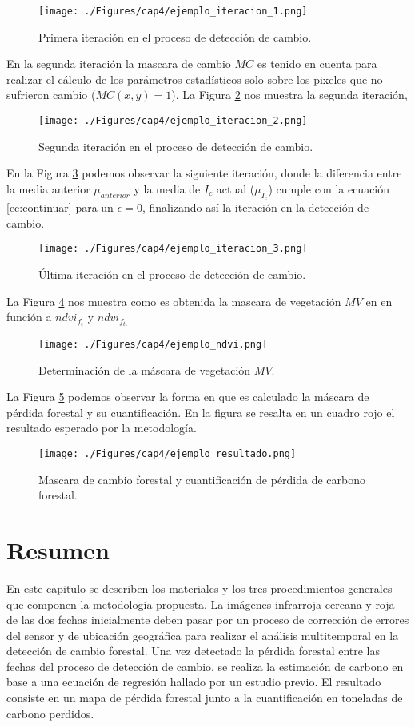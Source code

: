 \begin{figure}[H]
	\centering
	\texttt{[image: ./Figures/cap4/ejemplo\_iteracion\_1.png]}
	\caption{Primera iteraci\'on en el proceso de detecci\'on de cambio.}
	\label{fig:ejemplo_2}
\end{figure}
En la segunda iteraci\'on la mascara de cambio $ MC $ es tenido en cuenta para realizar el c\'alculo de los par\'ametros estad\'isticos solo sobre los pixeles que no sufrieron cambio ($ MC(x,y)=1 $). La Figura \ref{fig:ejemplo_3} nos muestra la segunda iteraci\'on, 
\begin{figure}[H]
	\centering
	\texttt{[image: ./Figures/cap4/ejemplo\_iteracion\_2.png]}
	\caption{Segunda iteraci\'on en el proceso de detecci\'on de cambio.}
	\label{fig:ejemplo_3}
\end{figure}
En la Figura \ref{fig:ejemplo_4} podemos observar la siguiente iteraci\'on, donde la diferencia entre la media anterior $ \mu_{anterior} $ y la media de $ I_{c} $ actual ($ \mu_{I_{c}} $) cumple con la ecuaci\'on \ref{ec:continuar} para un $\epsilon=0 $, finalizando as\'i la iteraci\'on en la detecci\'on de cambio.
\begin{figure}[H]
	\centering
	\texttt{[image: ./Figures/cap4/ejemplo\_iteracion\_3.png]}
	\caption{\'Ultima iteraci\'on en el proceso de detecci\'on de cambio.}
	\label{fig:ejemplo_4}
\end{figure}
La Figura \ref{fig:ejemplo_5} nos muestra como es obtenida la mascara de vegetaci\'on $ MV $ en en funci\'on a $ ndvi_{f_{t}} $ y $ ndvi_{f_{t_{*}}} $
\begin{figure}[H]
	\centering
	\texttt{[image: ./Figures/cap4/ejemplo\_ndvi.png]}
	\caption{Determinaci\'on de la m\'ascara de vegetaci\'on $ MV $.}
	\label{fig:ejemplo_5}
\end{figure}
La Figura \ref{fig:ejemplo_6} podemos observar la forma en que es calculado la m\'ascara de p\'erdida forestal y su cuantificaci\'on. En la figura se resalta en un cuadro rojo el resultado esperado por la metodolog\'ia. 
\begin{figure}[H]
	\centering
	\texttt{[image: ./Figures/cap4/ejemplo\_resultado.png]}
	\caption{Mascara de cambio forestal y cuantificaci\'on de p\'erdida de carbono forestal.}
	\label{fig:ejemplo_6}
\end{figure}
\section{Resumen}
En este capitulo se describen los materiales y los tres procedimientos generales que componen la metodolog\'ia propuesta. La im\'agenes infrarroja cercana y roja de las dos fechas inicialmente deben pasar por un proceso de correcci\'on de errores del sensor y de ubicaci\'on geogr\'afica para realizar el an\'alisis multitemporal en la detecci\'on de cambio forestal. Una vez detectado la p\'erdida forestal entre las fechas del proceso de detecci\'on de cambio, se realiza la estimaci\'on de carbono en base a una ecuaci\'on de regresi\'on hallado por un estudio previo. El resultado consiste en un mapa de p\'erdida forestal junto a la cuantificaci\'on en toneladas de carbono perdidos.